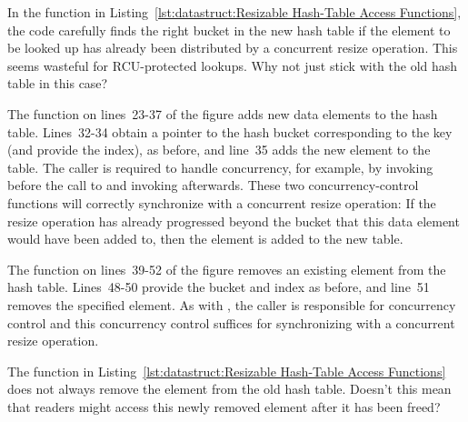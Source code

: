 \QuickQuiz{}
	In the  function in
	Listing~\ref{lst:datastruct:Resizable Hash-Table Access Functions},
	the code carefully finds the right bucket in the new hash table
	if the element to be looked up has already been distributed
	by a concurrent resize operation.
	This seems wasteful for RCU-protected lookups.
	Why not just stick with the old hash table in this case?
 \QuickQuizEnd

The  function on lines~23-37 of the figure adds
new data elements to the hash table.
Lines~32-34 obtain a pointer to the hash bucket corresponding to
the key (and provide the index), as before, and line~35 adds the new
element to the table.
The caller is required to handle concurrency, for example, by invoking
 before the call to  and invoking
 afterwards.
These two concurrency-control functions will correctly synchronize with
a concurrent resize operation:  If the resize operation has already
progressed beyond the bucket that this data element would have been added to,
then the element is added to the new table.

The  function on lines~39-52 of the figure removes
an existing element from the hash table.
Lines~48-50 provide the bucket and index as before, and line~51 removes
the specified element.
As with , the caller is responsible for concurrency
control and this concurrency control suffices for synchronizing with
a concurrent resize operation.

\QuickQuiz{}
	The  function in
	Listing~\ref{lst:datastruct:Resizable Hash-Table Access Functions}
	does not always remove the element from the old hash table.
	Doesn't this mean that readers might access this newly removed
	element after it has been freed?
 \QuickQuizEnd

